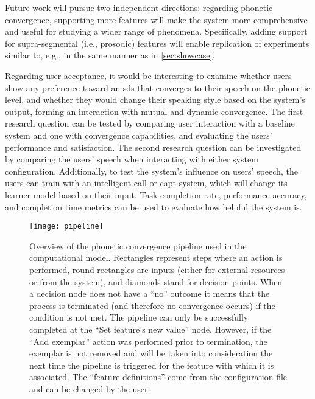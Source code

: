 Future work will pursue two independent directions:
regarding phonetic convergence, supporting more features will make the system more comprehensive and useful for studying a wider range of phenomena.
Specifically, adding support for supra-segmental (i.e., prosodic) features will enable replication of experiments similar to, e.g., \citet{Levitan2014acoustic, Levitan2016implementing} in the same manner as in \cref{sec:showcase}.

Regarding user acceptance, it would be interesting to examine whether users show any preference toward an \ac{sds} that converges to their speech on the phonetic level, and whether they would change their speaking style based on the system's output, forming an interaction with mutual and dynamic convergence.
The first research question can be tested by comparing user interaction with a baseline system and one with convergence capabilities, and evaluating the users' performance and satisfaction.
The second research question can be investigated by comparing the users' speech when interacting with either system configuration.
Additionally, to test the system's influence on users' speech, the users can train with an intelligent \acf{call} or \acf{capt} system, which will change its learner model based on their input.
Task completion rate, performance accuracy, and completion time metrics can be used to evaluate how helpful the system is.

\begin{figure}[h!]
	\centering
	\texttt{[image: pipeline]}
	\caption[Phonetic convergence algorithm pipeline]{Overview of the phonetic convergence pipeline used in the computational model.
		Rectangles represent steps where an action is performed, round rectangles are inputs (either for external resources or from the system), and diamonds stand for decision points.
		When a decision node does not have a \enquote{no} outcome it means that the process is terminated (and therefore no convergence occurs) if the condition is not met.
		The pipeline can only be successfully completed at the \enquote{Set feature's new value} node.
		However, if the \enquote{Add exemplar} action was performed prior to termination, the exemplar is not removed and will be taken into consideration the next time the pipeline is triggered for the feature with which it is associated.
		The \enquote{feature definitions} come from the configuration file and can be changed by the user.}
	\label{fig:adaptation_module_pipeline}
\end{figure}

